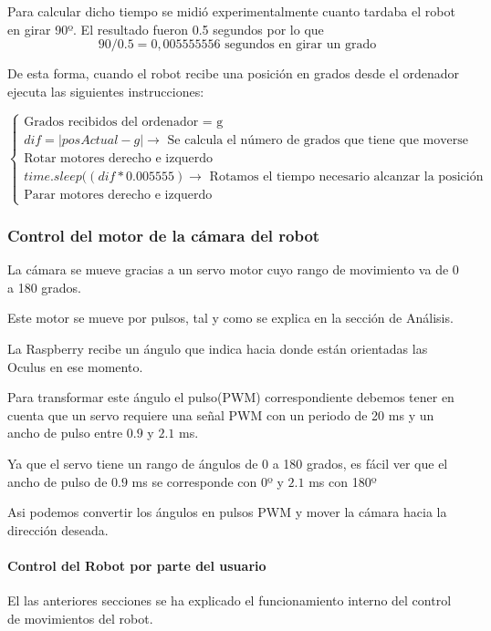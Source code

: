 \documentclass[twoside, 12pt]{epstfg}
\begin{document}
Para calcular dicho tiempo se midió experimentalmente cuanto tardaba el robot en girar 90º. El resultado fueron 0.5 segundos por lo que 
$$90 / 0.5 = 0,005555556 \text{ segundos en girar un grado}$$

De esta forma, cuando el robot recibe una posición en grados desde el ordenador ejecuta las siguientes instrucciones:


$\begin{cases}
\text{Grados recibidos del ordenador = g}\\
dif = |posActual-g|\rightarrow\text{ Se calcula el número de grados que tiene que moverse}\\
\text{Rotar motores derecho e izquerdo}\\
time.sleep((dif*0.005555) \rightarrow \text{ Rotamos el tiempo necesario alcanzar la posición}\\
\text{Parar motores derecho e izquerdo}
\end{cases}$



\subsubsection{Control del motor de la cámara del robot}

La cámara se mueve gracias a un servo motor cuyo rango de movimiento va de 0 a 180 grados.

Este motor se mueve por pulsos, tal y como se explica en la sección de Análisis.

La Raspberry recibe un ángulo que indica hacia donde están orientadas las Oculus en ese momento.

Para transformar este ángulo el pulso(PWM) correspondiente debemos tener en cuenta que un servo requiere una señal PWM con un periodo de 20 ms y un ancho de pulso entre $0.9$ y $2.1$ ms.

Ya que el servo tiene un rango de ángulos de 0 a 180 grados, es fácil ver que el ancho de pulso de $0.9$ ms se corresponde con 0º y $2.1$ ms con 180º

Asi podemos convertir los ángulos en pulsos PWM y mover la cámara hacia la dirección deseada.

\paragraph{Control del Robot por parte del usuario}

El las anteriores secciones se ha explicado el funcionamiento interno del control de movimientos del robot.
\end{document}
